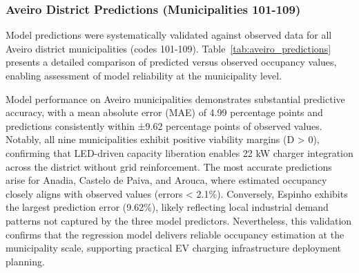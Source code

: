 \documentclass[conference]{IEEEtran}
\begin{document}
\subsubsection{Aveiro District Predictions (Municipalities 101-109)}

Model predictions were systematically validated against observed data for all Aveiro district municipalities (codes 101-109). Table~\ref{tab:aveiro_predictions} presents a detailed comparison of predicted versus observed occupancy values, enabling assessment of model reliability at the municipality level.

\begin{table}[H]
\centering
\caption{Predicted vs. Observed PTD Occupancy: Aveiro District Municipalities}
\small
{}
\label{tab:aveiro_predictions}
\end{table}

Model performance on Aveiro municipalities demonstrates substantial predictive accuracy, with a mean absolute error (MAE) of 4.99 percentage points and predictions consistently within ±9.62 percentage points of observed values. Notably, all nine municipalities exhibit positive viability margins (D > 0), confirming that LED-driven capacity liberation enables 22 kW charger integration across the district without grid reinforcement. The most accurate predictions arise for Anadia, Castelo de Paiva, and Arouca, where estimated occupancy closely aligns with observed values (errors < 2.1\%). Conversely, Espinho exhibits the largest prediction error (9.62\%), likely reflecting local industrial demand patterns not captured by the three model predictors. Nevertheless, this validation confirms that the regression model delivers reliable occupancy estimation at the municipality scale, supporting practical EV charging infrastructure deployment planning.
\end{document}
